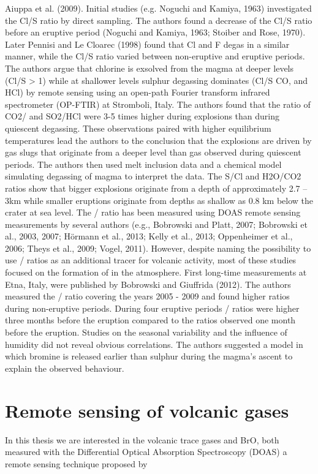 \documentclass  [
  paper    = a4,
  BCOR     = 10mm,
  twoside,
  fontsize = 12pt,
  fleqn,
  toc      = bibnumbered,
  toc      = listofnumbered,
  numbers  = noendperiod,
  headings = normal,
  listof   = leveldown,
  version  = 3.03
]                                       {scrreprt}
\begin{document}
	Aiuppa et al. (2009). Initial studies (e.g. Noguchi and Kamiya, 1963) investigated
	the Cl/S ratio by direct sampling. The authors found a decrease of the Cl/S
	ratio before an eruptive period (Noguchi and Kamiya, 1963; Stoiber and Rose,
	1970). Later Pennisi and Le Cloarec (1998) found that Cl and F degas in a
	similar manner, while the Cl/S ratio varied between non-eruptive and eruptive
	periods. The authors argue that chlorine is exsolved from the magma at deeper
	levels (Cl/S > 1) while at shallower levels sulphur degassing dominates (Cl/S
	CO,  and HCl) by remote sensing using an open-path Fourier transform
	infrared spectrometer (OP-FTIR) at Stromboli, Italy. The authors found that
	the ratio of CO2/ and SO2/HCl were 3-5 times higher during explosions than
	during quiescent degassing. These observations paired with higher equilibrium
	temperatures lead the authors to the conclusion that the explosions are driven by
	gas slugs that originate from a deeper level than gas observed during quiescent
	periods. The authors then used melt inclusion data and a chemical model
	simulating degassing of magma to interpret the data. The S/Cl and H2O/CO2
	ratios show that bigger explosions originate from a depth of approximately
	2.7 – 3km while smaller eruptions originate from depths as shallow as 0.8 km
	below the crater at sea level.
	The / ratio has been measured using DOAS remote sensing measurements
	by several authors (e.g., Bobrowski and Platt, 2007; Bobrowski et al.,
	2003, 2007; Hörmann et al., 2013; Kelly et al., 2013; Oppenheimer et al., 2006;
	Theys et al., 2009; Vogel, 2011). However, despite naming the possibility to
	use / ratios as an additional tracer for volcanic activity, most of these
	studies focused on the formation of  in the atmosphere. First long-time
	measurements at Etna, Italy, were published by Bobrowski and Giuffrida (2012).
	The authors measured the / ratio covering the years 2005 - 2009 and
	found higher ratios during non-eruptive periods. During four eruptive periods
	/ ratios were higher three months before the eruption compared to the
	ratios observed one month before the eruption. Studies on the seasonal variability
	and the influence of humidity did not reveal obvious correlations. The authors
	suggested a model in which bromine is released earlier than sulphur during the
	magma’s ascent to explain the observed behaviour.
	\section{Remote sensing of volcanic gases}
	In this thesis we are interested in the volcanic trace gases  and BrO, both measured with the Differential Optical Absorption Spectroscopy (DOAS) a remote sensing technique proposed by \cite{platt2008differential}\\
	\\
	
\end{document}
